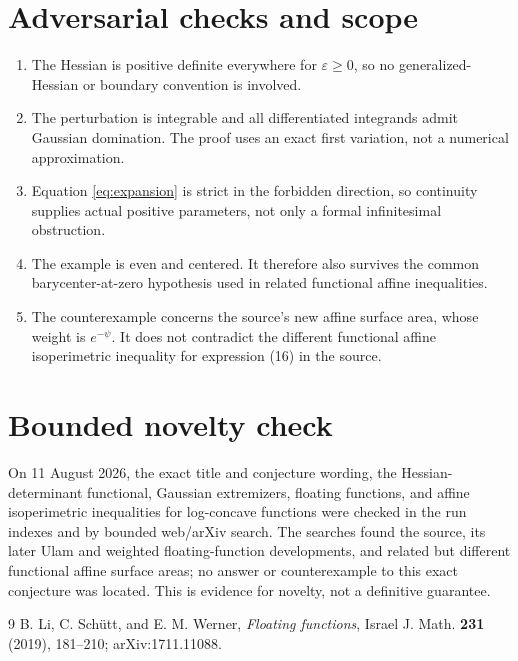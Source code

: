 \documentclass[11pt]{article}
\begin{document}
\section*{Adversarial checks and scope}
\begin{enumerate}[leftmargin=2em]
\item The Hessian is positive definite everywhere for $\varepsilon\geq0$, so no generalized-Hessian or boundary convention is involved.
\item The perturbation is integrable and all differentiated integrands admit Gaussian domination.  The proof uses an exact first variation, not a numerical approximation.
\item Equation \eqref{eq:expansion} is strict in the forbidden direction, so continuity supplies actual positive parameters, not only a formal infinitesimal obstruction.
\item The example is even and centered.  It therefore also survives the common barycenter-at-zero hypothesis used in related functional affine inequalities.
\item The counterexample concerns the source's new affine surface area, whose weight is $e^{-\psi}$.  It does not contradict the different functional affine isoperimetric inequality for expression (16) in the source.
\end{enumerate}

\section*{Bounded novelty check}
On 11 August 2026, the exact title and conjecture wording, the Hessian-determinant functional, Gaussian extremizers, floating functions, and affine isoperimetric inequalities for log-concave functions were checked in the run indexes and by bounded web/arXiv search.  The searches found the source, its later Ulam and weighted floating-function developments, and related but different functional affine surface areas; no answer or counterexample to this exact conjecture was located.  This is evidence for novelty, not a definitive guarantee.

\begin{thebibliography}{9}
B. Li, C. Sch\"utt, and E. M. Werner,
\emph{Floating functions},
Israel J. Math. \textbf{231} (2019), 181--210; arXiv:1711.11088.
\end{thebibliography}
\end{document}
